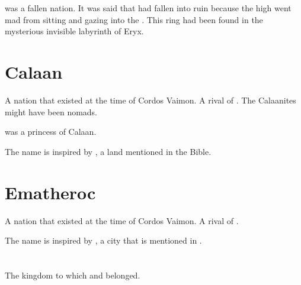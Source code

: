 \section{\Asaathur}
\index{\Asaathur}
\Asaathur was a fallen \ophidian nation. 
It was said that \Asaathur had fallen into ruin because the high  went mad from sitting and gazing into the .
This ring had been found in the mysterious invisible labyrinth of Eryx.















\section{Calaan}
A \human nation that existed at the time of Cordos Vaimon. 
A rival of \Imrath. 
The Calaanites might have been nomads. 

 was a princess of {Calaan}.

The name is inspired by , a land mentioned in the Bible.















\section{Ematheroc}
A nation that existed at the time of Cordos Vaimon. 
A rival of \Imrath. 

The name is inspired by , a city that is mentioned in \cite{HPLovecraft:TheDoomThatCametoSarnath}. 















\section{\Imrath}
\index{\Imrath}
The \human kingdom to which  and  belonged. 


